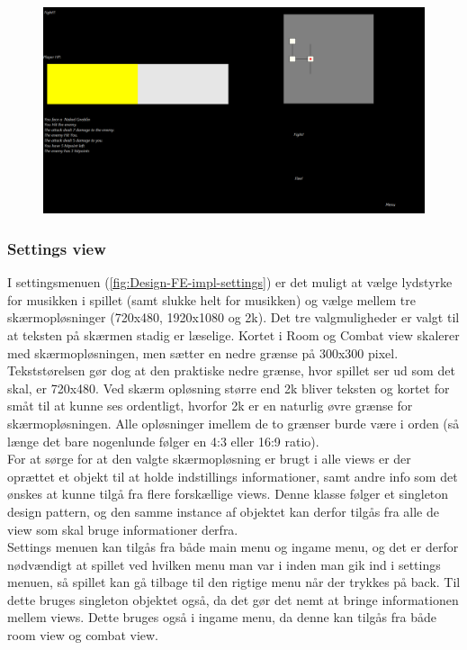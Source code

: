 \begin{figure}[h]
\centering
\includegraphics[width = \textwidth]{02-Body/Images/combat_final.PNG}
\caption{}
\label{fig:Design-FE-impl-combat}
\end{figure}

\subsubsection{Settings view}

I settingsmenuen (\autoref{fig:Design-FE-impl-settings}) er det muligt at vælge lydstyrke for musikken i spillet (samt slukke helt for musikken) og vælge mellem tre skærmopløsninger (720x480, 1920x1080 og 2k). Det tre valgmuligheder er valgt til at teksten på skærmen stadig er læselige. Kortet i Room og Combat view skalerer med skærmopløsningen, men sætter en nedre grænse på 300x300 pixel. Tekststørelsen gør dog at den praktiske nedre grænse, hvor spillet ser ud som det skal, er 720x480. Ved skærm opløsning større end 2k bliver teksten og kortet for småt til at kunne ses ordentligt, hvorfor 2k er en naturlig øvre grænse for skærmopløsningen. Alle opløsninger imellem de to grænser burde være i orden (så længe det bare nogenlunde følger en 4:3 eller 16:9 ratio).\\

\noindent For at sørge for at den valgte skærmopløsning er brugt i alle views er der oprættet et objekt til at holde indstillings informationer, samt andre info som det ønskes at kunne tilgå fra flere forskællige views. Denne klasse følger et singleton design pattern, og den samme instance af objektet kan derfor tilgås fra alle de view som skal bruge informationer derfra.\\

\noindent
Settings menuen kan tilgås fra både main menu og ingame menu, og det er derfor nødvændigt at spillet ved hvilken menu man var i inden man gik ind i settings menuen, så spillet kan gå tilbage til den rigtige menu når der trykkes på back. Til dette bruges singleton objektet også, da det gør det nemt at bringe informationen mellem views. Dette bruges også i ingame menu, da denne kan tilgås fra både room view og combat view.

